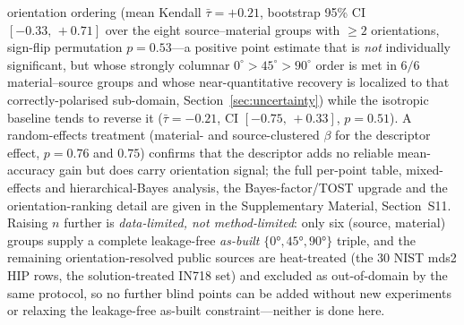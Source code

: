 \documentclass[twocolumn]{sagej}
\begin{document}
orientation ordering (mean Kendall $\bar\tau = +0.21$, bootstrap 95\% CI $[-0.33,\,+0.71]$ over the eight source--material groups with $\ge2$ orientations, sign-flip permutation $p = 0.53$---a positive point estimate that is \emph{not} individually significant, but whose strongly columnar $0^\circ\!>\!45^\circ\!>\!90^\circ$ order is met in $6/6$ material--source groups and whose near-quantitative recovery is localized to that correctly-polarised sub-domain, Section~\ref{sec:uncertainty}) while the isotropic baseline tends to reverse it ($\bar\tau = -0.21$, CI $[-0.75,\,+0.33]$, $p = 0.51$). A random-effects treatment (material- and source-clustered $\beta$ for the descriptor effect, $p = 0.76$ and $0.75$) confirms that the descriptor adds no reliable mean-accuracy gain but does carry orientation signal; the full per-point table, mixed-effects and hierarchical-Bayes analysis, the Bayes-factor/TOST upgrade and the orientation-ranking detail are given in the Supplementary Material, Section~S11. Raising $n$ further is \emph{data-limited, not method-limited}: only six (source, material) groups supply a complete leakage-free \emph{as-built} $\{\ang{0},\ang{45},\ang{90}\}$ triple, and the remaining orientation-resolved public sources are heat-treated (the 30 NIST mds2 HIP rows, the solution-treated IN718 set) and excluded as out-of-domain by the same protocol, so no further blind points can be added without new experiments or relaxing the leakage-free as-built constraint---neither is done here.
\end{document}
